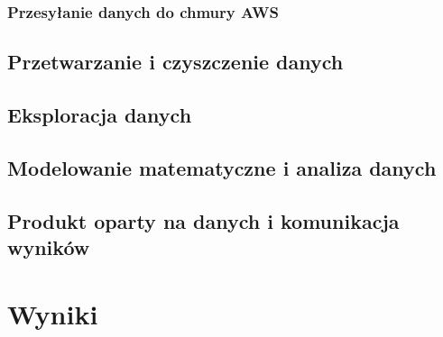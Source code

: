 \documentclass[12pt, a4paper]{article}
\begin{document}
\subsubsection{Przesyłanie danych do chmury AWS}








\subsection{Przetwarzanie i czyszczenie danych}


\subsection{Eksploracja danych}
\subsection{Modelowanie matematyczne i analiza danych}
\subsection{Produkt oparty na danych i komunikacja wyników}

\section{Wyniki}
\end{document}
